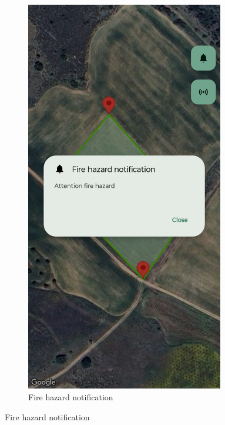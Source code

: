 \begin{enumerate}
\begin{figure}[H]
\begin{subfigure}[t]{0.3\textwidth}
            \end{subfigure}
            \begin{subfigure}[t]{0.3\textwidth}
                \centering
                \includegraphics[width=0.95\textwidth]{images/8/10.png}
                \caption{Fire hazard notification}
            \end{subfigure}

\end{figure}
\end{enumerate}
